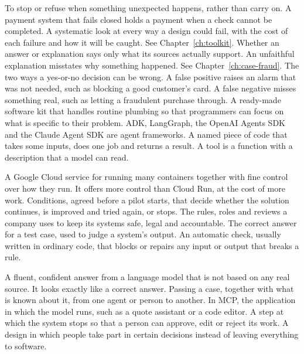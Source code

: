 \begin{description}[style=nextline, leftmargin=1.2em, itemsep=4pt, font=\normalfont\bfseries\sffamily\small]
 To stop or refuse when something unexpected happens, rather than carry on. A payment system that fails closed holds a payment when a check cannot be completed.
 A systematic look at every way a design could fail, with the cost of each failure and how it will be caught. See Chapter~\ref{ch:toolkit}.
 Whether an answer or explanation says only what its sources actually support. An unfaithful explanation misstates why something happened. See Chapter~\ref{ch:case-fraud}.
 The two ways a yes-or-no decision can be wrong. A false positive raises an alarm that was not needed, such as blocking a good customer's card. A false negative misses something real, such as letting a fraudulent purchase through.
 A ready-made software kit that handles routine plumbing so that programmers can focus on what is specific to their problem. ADK, LangGraph, the OpenAI Agents SDK and the Claude Agent SDK are agent frameworks.
 A named piece of code that takes some inputs, does one job and returns a result. A tool is a function with a description that a model can read.

 A Google Cloud service for running many containers together with fine control over how they run. It offers more control than Cloud Run, at the cost of more work.
 Conditions, agreed before a pilot starts, that decide whether the solution continues, is improved and tried again, or stops.
 The rules, roles and reviews a company uses to keep its systems safe, legal and accountable.
 The correct answer for a test case, used to judge a system's output.
 An automatic check, usually written in ordinary code, that blocks or repairs any input or output that breaks a rule.

 A fluent, confident answer from a language model that is not based on any real source. It looks exactly like a correct answer.
 Passing a case, together with what is known about it, from one agent or person to another.
 In MCP, the application in which the model runs, such as a quote assistant or a code editor.
 A step at which the system stops so that a person can approve, edit or reject its work.
 A design in which people take part in certain decisions instead of leaving everything to software.


\end{description}
